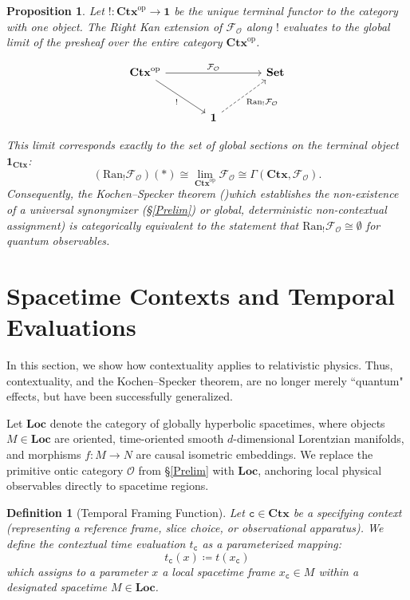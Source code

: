 \documentclass{article}
\newtheorem{dn}{Definition}
\newtheorem{pp}{Proposition}
\numberwithin{tm}{section}
\numberwithin{dn}{section}
\numberwithin{as}{section}
\numberwithin{rk}{section}
\numberwithin{lem}{section}
\numberwithin{ax}{section}
\numberwithin{pp}{section}
\numberwithin{eg}{section}
\numberwithin{war}{section}
\numberwithin{equation}{section}
\numberwithin{prop}{section}
\numberwithin{nt}{section}
\numberwithin{rc}{section}
\def\code#1{\texttt{#1}}
\begin{document}
\begin{pp}
	Let $!: \mathbf{Ctx}^{\text{op}} \to \mathbf{1}$ be the unique terminal functor to the category with one object. The Right Kan extension of $\mathcal{F}_\mathcal{O}$ along $!$ evaluates to the global limit of the presheaf over the entire category $\mathbf{Ctx}^{\text{op}}$. 
	
	\begin{equation}
		\begin{tikzcd}[row sep=large, column sep=large]
			\mathbf{Ctx}^{\text{op}} \arrow[rr, "\mathcal{F}_\mathcal{O}"] \arrow[dr, "!"'] & & \mathbf{Set} \\
			& \mathbf{1} \arrow[ur, dashed, "\mathrm{Ran}_! \mathcal{F}_\mathcal{O}"'] &
		\end{tikzcd}
	\end{equation}
	
	This limit corresponds exactly to the set of global sections on the terminal object $\mathbf{1}_{\mathbf{Ctx}}$:
	\begin{equation}
		(\mathrm{Ran}_! \mathcal{F}_\mathcal{O})(\ast) \cong \lim_{\mathbf{Ctx}^{\text{op}}} \mathcal{F}_\mathcal{O} \cong \Gamma(\mathbf{Ctx}, \mathcal{F}_\mathcal{O}) .
	\end{equation}
	Consequently, the Kochen--Specker theorem ()which establishes the non-existence of a universal synonymizer (\S\ref{Prelim}) or global, deterministic non-contextual assignment) is categorically equivalent to the statement that $\mathrm{Ran}_! \mathcal{F}_\mathcal{O} \cong \emptyset$ for quantum observables.
\end{pp}
\section{Spacetime Contexts and Temporal Evaluations} \label{Spacetime}
In this section, we show how contextuality applies to relativistic physics. Thus, contextuality, and the Kochen--Specker theorem, are no longer merely ``quantum" effects, but have been successfully generalized. 

Let $\mathbf{Loc}$ denote the category of globally hyperbolic spacetimes, where objects $M \in \mathbf{Loc}$ are oriented, time-oriented smooth $d$-dimensional Lorentzian manifolds, and morphisms $f: M \to N$ are causal isometric embeddings. We replace the primitive ontic category $\mathcal{O}$ from \S\ref{Prelim} with $\mathbf{Loc}$, anchoring local physical observables directly to spacetime regions.

\begin{dn}[Temporal Framing Function]
	Let $\code{c} \in \mathbf{Ctx}$ be a specifying context (representing a reference frame, slice choice, or observational apparatus). We define the \emph{contextual time evaluation} $t_{\code{c}}$ as a parameterized mapping:
	\begin{equation}
		t_{\code{c}}(x) \coloneq t(x_{\code{c}})
	\end{equation}
	which assigns to a parameter $x$ a local spacetime frame $x_{\code{c}} \in M$ within a designated spacetime $M \in \mathbf{Loc}$.
\end{dn}
\end{document}
